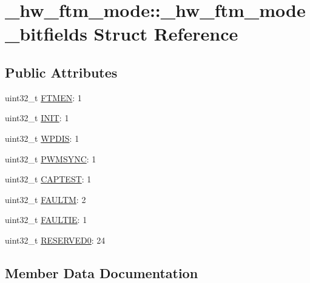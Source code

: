 \hypertarget{struct__hw__ftm__mode_1_1__hw__ftm__mode__bitfields}{}\section{\+\_\+hw\+\_\+ftm\+\_\+mode\+:\+:\+\_\+hw\+\_\+ftm\+\_\+mode\+\_\+bitfields Struct Reference}
\label{struct__hw__ftm__mode_1_1__hw__ftm__mode__bitfields}
\subsection*{Public Attributes}
\begin{DoxyCompactItemize}
\item 
uint32\+\_\+t \hyperlink{struct__hw__ftm__mode_1_1__hw__ftm__mode__bitfields_a583ac654a039c0cad21fbdd21de6d153}{F\+T\+M\+EN}\+: 1
\item 
uint32\+\_\+t \hyperlink{struct__hw__ftm__mode_1_1__hw__ftm__mode__bitfields_a2b3fc9574caa59d8f21d373cce53bd86}{I\+N\+IT}\+: 1
\item 
uint32\+\_\+t \hyperlink{struct__hw__ftm__mode_1_1__hw__ftm__mode__bitfields_a289c31438e0c931a1eb2740e291dd978}{W\+P\+D\+IS}\+: 1
\item 
uint32\+\_\+t \hyperlink{struct__hw__ftm__mode_1_1__hw__ftm__mode__bitfields_a570692fbcd59021b0099f55bc4de4894}{P\+W\+M\+S\+Y\+NC}\+: 1
\item 
uint32\+\_\+t \hyperlink{struct__hw__ftm__mode_1_1__hw__ftm__mode__bitfields_ae782ac718411000d7a2fdf122f4299e6}{C\+A\+P\+T\+E\+ST}\+: 1
\item 
uint32\+\_\+t \hyperlink{struct__hw__ftm__mode_1_1__hw__ftm__mode__bitfields_ac7287b67796cd456c1ffacb98cb24a63}{F\+A\+U\+L\+TM}\+: 2
\item 
uint32\+\_\+t \hyperlink{struct__hw__ftm__mode_1_1__hw__ftm__mode__bitfields_a5a194b022e9a02cd792a705088fb5fd9}{F\+A\+U\+L\+T\+IE}\+: 1
\item 
uint32\+\_\+t \hyperlink{struct__hw__ftm__mode_1_1__hw__ftm__mode__bitfields_aa2f25d70b67ec604e99608fb54523cae}{R\+E\+S\+E\+R\+V\+E\+D0}\+: 24
\end{DoxyCompactItemize}


\subsection{Member Data Documentation}
